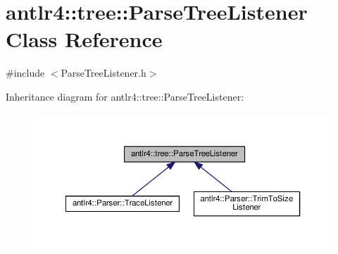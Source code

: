 \hypertarget{classantlr4_1_1tree_1_1ParseTreeListener}{}\section{antlr4\+:\+:tree\+:\+:Parse\+Tree\+Listener Class Reference}
\label{classantlr4_1_1tree_1_1ParseTreeListener}


{\ttfamily \#include $<$Parse\+Tree\+Listener.\+h$>$}



Inheritance diagram for antlr4\+:\+:tree\+:\+:Parse\+Tree\+Listener\+:
\nopagebreak
\begin{figure}[H]
\begin{center}
\leavevmode
\includegraphics[width=350pt]{classantlr4_1_1tree_1_1ParseTreeListener__inherit__graph}
\end{center}
\end{figure}
